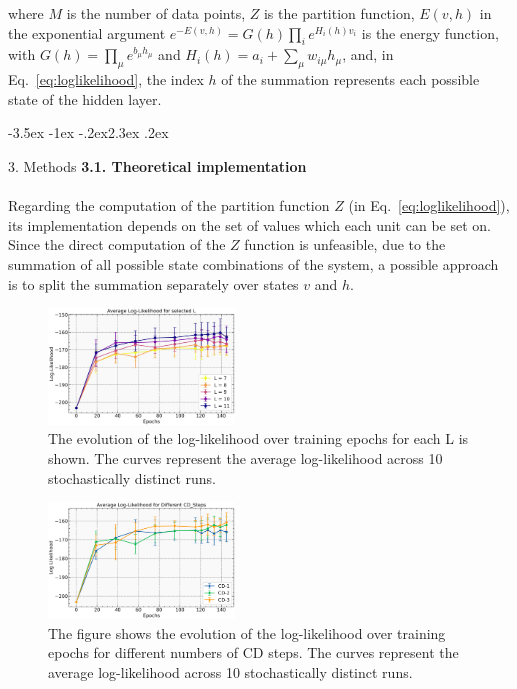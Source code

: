 \documentclass[prl,twocolumn]{revtex4-1}
\makeatletter
\renewcommand{\section}{\@startsection{section}{1}{\z@}%
	{-3.5ex \@plus -1ex \@minus -.2ex}{2.3ex \@plus.2ex}%
	{\normalfont\bfseries\raggedright}}
\makeatother
\begin{document}
where $M$ is the number of data points, $Z$ is the partition function, $E(v,h)$ in the exponential argument $e^{-E(v,h)}=G(h)\prod_{i}{e^{H_i(h)v_i}}$ is the energy function, with $G(h)=\prod_{\mu}{e^{b_{\mu}h_{\mu}}}$ and $H_i(h)=a_i+\sum_{\mu}w_{i\mu}h_\mu$, and, in Eq.~\ref{eq:loglikelihood}, the index $h$ of the summation represents each possible state of the hidden layer.


\section{3. Methods}
\noindent\textbf{3.1. Theoretical implementation}
\\
\\
Regarding the computation of the partition function $Z$ (in Eq.~\ref{eq:loglikelihood}), its implementation depends on the set of values which each unit can be set on. Since the direct computation of the $Z$ function is unfeasible, due to the summation of all possible state combinations of the system, a possible approach is to split the summation separately over states $v$ and $h$.

\begin{figure}[!tb]
	\includegraphics[width=0.44\textwidth]{L_of_epochs.jpg}
	\caption{The evolution of the log-likelihood over training epochs for each L is shown. The curves represent the average log-likelihood across 10 stochastically distinct runs.}
	\label{fig:L_of_epochs}
\end{figure}

\begin{figure}[!tb]
	\includegraphics[width=0.44\textwidth]{L_of_CD.png}
	\caption{The figure shows the evolution of the log-likelihood over training epochs for different numbers of CD steps. The curves represent the average log-likelihood across 10 stochastically distinct runs.}
	\label{fig:L_of_CD}
\end{figure}
\end{document}
